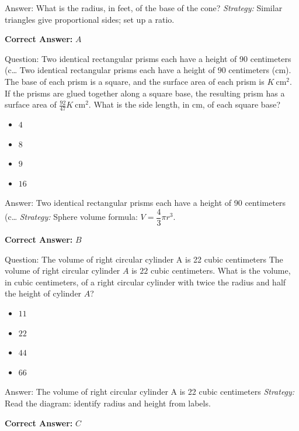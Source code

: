 \documentclass{beamer}
\begin{document}
\begin{frame}{Answer: What is the radius, in feet, of the base of the cone?}
\textit{Strategy:} Similar triangles give proportional sides; set up a ratio.

\textbf{Correct Answer:} \( \boxed{A} \)

\end{frame}
\begin{frame}{Question: Two identical rectangular prisms each have a height of 90 centimeters (c…}
Two identical rectangular prisms each have a height of $90$ centimeters (cm).  
The base of each prism is a square, and the surface area of each prism is $K\ \text{cm}^2$.  
If the prisms are glued together along a square base, the resulting prism has a surface area of $\frac{92}{47}K\ \text{cm}^2$.  
What is the side length, in cm, of each square base?
\begin{itemize}
    \item[\textbf{A.}] $4$
    \item[\textbf{B.}] $8$
    \item[\textbf{C.}] $9$
    \item[\textbf{D.}] $16$
\end{itemize}
\end{frame}
\begin{frame}{Answer: Two identical rectangular prisms each have a height of 90 centimeters (c…}
\textit{Strategy:} Sphere volume formula: $V=\dfrac{4}{3}\pi r^3$.

\textbf{Correct Answer:} \( \boxed{B} \)

\end{frame}
\begin{frame}{Question: The volume of right circular cylinder A is 22 cubic centimeters}
The volume of right circular cylinder $A$ is $22$ cubic centimeters.  
What is the volume, in cubic centimeters, of a right circular cylinder with twice the radius and half the height of cylinder $A$?
\begin{itemize}
    \item[\textbf{A.}] $11$
    \item[\textbf{B.}] $22$
    \item[\textbf{C.}] $44$
    \item[\textbf{D.}] $66$
\end{itemize}
\end{frame}
\begin{frame}{Answer: The volume of right circular cylinder A is 22 cubic centimeters}
\textit{Strategy:} Read the diagram: identify radius and height from labels.

\textbf{Correct Answer:} \( \boxed{C} \)

\end{frame}
\end{document}
